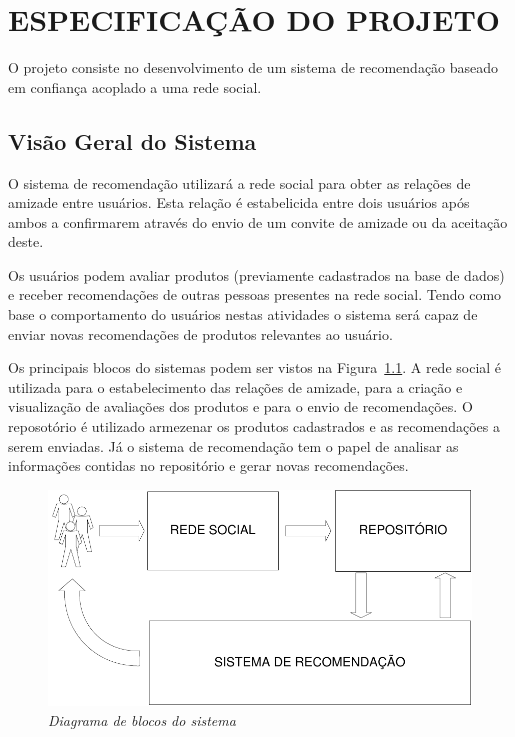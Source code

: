 \chapter{ESPECIFICAÇÃO DO PROJETO} %
\label{cha:especificacao_do_projeto}


 O projeto consiste no desenvolvimento de um sistema de recomendação baseado em confiança acoplado a uma rede social.

\section{Visão Geral do Sistema} %
\label{sec:visao_do_sistema}

O sistema de recomendação utilizará a rede social para obter as relações de amizade entre usuários. Esta relação é estabelicida entre dois usuários após ambos a confirmarem através do envio de um convite de amizade ou da aceitação deste.

Os usuários podem avaliar produtos (previamente cadastrados na base de dados) e receber recomendações de outras pessoas presentes na rede social. Tendo como base o comportamento do usuários nestas atividades o sistema será capaz de enviar novas recomendações de produtos relevantes ao usuário.

 Os principais blocos do sistemas podem ser vistos na Figura~\ref{fig:escopo}. A rede social é utilizada para o estabelecimento das relações de amizade, para a criação e visualização de avaliações dos produtos e para o envio de recomendações. O reposotório é utilizado armezenar os produtos cadastrados e as recomendações a serem enviadas. Já o sistema de recomendação tem o papel de analisar as informações contidas no repositório e gerar novas recomendações.

\begin{figure}
  \centering
  \includegraphics[width=\textwidth]{imagens/Diagrama_Visao_Geral}
  \caption{\it Diagrama de blocos do sistema}
  \label{fig:escopo}
\end{figure}

